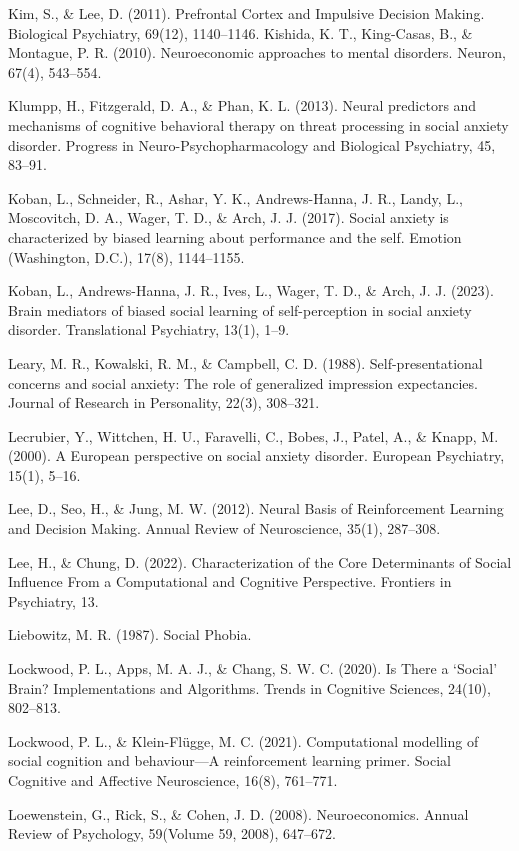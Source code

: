 \documentclass[12pt,a4paper,oneside,]{book} %
\begin{document}
Kim, S., \& Lee, D. (2011). Prefrontal Cortex and Impulsive Decision Making. Biological Psychiatry, 69(12), 1140--1146.
Kishida, K. T., King-Casas, B., \& Montague, P. R. (2010). Neuroeconomic approaches to mental disorders. Neuron, 67(4), 543--554.

Klumpp, H., Fitzgerald, D. A., \& Phan, K. L. (2013). Neural predictors and mechanisms of cognitive behavioral therapy on threat processing in social anxiety disorder. Progress in Neuro-Psychopharmacology and Biological Psychiatry, 45, 83--91.

Koban, L., Schneider, R., Ashar, Y. K., Andrews-Hanna, J. R., Landy, L., Moscovitch, D. A., Wager, T. D., \& Arch, J. J. (2017). Social anxiety is characterized by biased learning about performance and the self. Emotion (Washington, D.C.), 17(8), 1144--1155.

Koban, L., Andrews-Hanna, J. R., Ives, L., Wager, T. D., \& Arch, J. J. (2023). Brain mediators of biased social learning of self-perception in social anxiety disorder. Translational Psychiatry, 13(1), 1--9.

Leary, M. R., Kowalski, R. M., \& Campbell, C. D. (1988). Self-presentational concerns and social anxiety: The role of generalized impression expectancies. Journal of Research in Personality, 22(3), 308--321.

Lecrubier, Y., Wittchen, H. U., Faravelli, C., Bobes, J., Patel, A., \& Knapp, M. (2000). A European perspective on social anxiety disorder. European Psychiatry, 15(1), 5--16.

Lee, D., Seo, H., \& Jung, M. W. (2012). Neural Basis of Reinforcement Learning and Decision Making. Annual Review of Neuroscience, 35(1), 287--308.

Lee, H., \& Chung, D. (2022). Characterization of the Core Determinants of Social Influence From a Computational and Cognitive Perspective. Frontiers in Psychiatry, 13.

Liebowitz, M. R. (1987). Social Phobia.

Lockwood, P. L., Apps, M. A. J., \& Chang, S. W. C. (2020). Is There a `Social' Brain? Implementations and Algorithms. Trends in Cognitive Sciences, 24(10), 802--813.

Lockwood, P. L., \& Klein-Flügge, M. C. (2021). Computational modelling of social cognition and behaviour---A reinforcement learning primer. Social Cognitive and Affective Neuroscience, 16(8), 761--771.

Loewenstein, G., Rick, S., \& Cohen, J. D. (2008). Neuroeconomics. Annual Review of Psychology, 59(Volume 59, 2008), 647--672.
\end{document}
